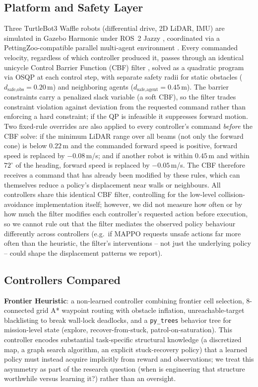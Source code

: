 \documentclass[11pt]{article}
\begin{document}
\subsection{Platform and Safety Layer}
Three TurtleBot3 Waffle robots (differential drive, 2D LiDAR, IMU) are
simulated in Gazebo Harmonic under ROS~2 Jazzy \cite{macenski2022ros2, gazebo},
coordinated via a PettingZoo-compatible parallel multi-agent environment
\cite{terry2021pettingzoo}. Every commanded velocity, regardless of which
controller produced it, passes through an identical unicycle Control
Barrier Function (CBF) filter \cite{ames2019cbf}, solved as a quadratic
program via OSQP \cite{stellato2020osqp} at each control step, with separate safety
radii for static obstacles ($d_{\text{safe,obs}}=0.20$\,m) and neighboring
agents ($d_{\text{safe,agent}}=0.45$\,m). The barrier constraints carry a
penalized slack variable (a soft CBF), so the filter trades constraint
violation against deviation from the requested command rather than
enforcing a hard constraint; if the QP is infeasible it suppresses forward
motion. Two fixed-rule overrides are also applied to every controller's
command \emph{before} the CBF solve: if the minimum LiDAR range over all
beams (not only the forward cone) is below $0.22$\,m and the commanded
forward speed is positive, forward speed is replaced by $-0.08$\,m/s; and
if another robot is within $0.45$\,m and within $72^\circ$ of the heading,
forward speed is replaced by $-0.05$\,m/s. The CBF therefore receives a
command that has already been modified by these rules, which can themselves
reduce a policy's displacement near walls or neighbours. All controllers share this
identical CBF filter, controlling for the low-level collision-avoidance
implementation itself; however, we did not measure how often or by how
much the filter modifies each controller's requested action before
execution, so we cannot rule out that the filter mediates the observed
policy behaviour differently across controllers (e.g.\ if MAPPO requests
unsafe actions far more often than the heuristic, the filter's
interventions -- not just the underlying policy -- could shape the
displacement patterns we report).

\subsection{Controllers Compared}
\textbf{Frontier Heuristic}: a non-learned controller combining frontier
cell selection, 8-connected grid A* \cite{hart1968astar} waypoint routing with
obstacle inflation, unreachable-target blacklisting to break wall-lock
deadlocks, and a \texttt{py\_trees} behavior tree for mission-level state
(explore, recover-from-stuck, patrol-on-saturation). This controller
encodes substantial task-specific structural knowledge (a discretized
map, a graph search algorithm, an explicit stuck-recovery policy) that a
learned policy must instead acquire implicitly from reward and
observations; we treat this asymmetry as part of the research question
(when is engineering that structure worthwhile versus learning it?)
rather than an oversight.
\end{document}
